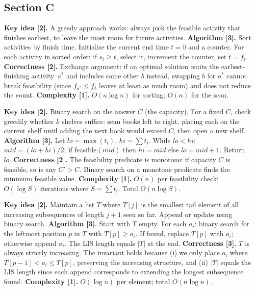 \subsection*{Section C}

\begin{solution}
\textbf{Key idea [2].} A greedy approach works: always pick the feasible activity that finishes earliest, to leave the most room for future activities.
\textbf{Algorithm [3].} Sort activities by finish time. Initialise the current end time $t=0$ and a counter. For each activity in sorted order: if $s_i \ge t$, select it, increment the counter, set $t = f_i$.
\textbf{Correctness [2].} Exchange argument: if an optimal solution omits the earliest-finishing activity~$a^*$ and includes some other $b$ instead, swapping $b$ for $a^*$ cannot break feasibility (since $f_{a^*} \le f_b$ leaves at least as much room) and does not reduce the count.
\textbf{Complexity [1].} $O(n \log n)$ for sorting; $O(n)$ for the scan.
\end{solution}

\begin{solution}
\textbf{Key idea [2].} Binary search on the answer $C$ (the capacity). For a fixed $C$, check greedily whether $k$ shelves suffice: scan books left to right, placing each on the current shelf until adding the next book would exceed $C$, then open a new shelf.
\textbf{Algorithm [3].} Let $lo = \max(t_i)$, $hi = \sum t_i$. While $lo < hi$: $mid = (lo+hi)/2$; if feasible$(mid)$ then $hi = mid$ else $lo = mid+1$. Return $lo$.
\textbf{Correctness [2].} The feasibility predicate is monotone: if capacity $C$ is feasible, so is any $C' > C$. Binary search on a monotone predicate finds the minimum feasible value.
\textbf{Complexity [1].} $O(n)$ per feasibility check; $O(\log S)$ iterations where $S = \sum t_i$. Total $O(n \log S)$.
\end{solution}

\begin{solution}
\textbf{Key idea [2].} Maintain a list $T$ where $T[j]$ is the smallest tail element of all increasing subsequences of length $j+1$ seen so far. Append or update using binary search.
\textbf{Algorithm [3].} Start with $T$ empty. For each $a_i$: binary search for the leftmost position $p$ in $T$ with $T[p] \ge a_i$. If found, replace $T[p]$ with $a_i$; otherwise append $a_i$. The LIS length equals $|T|$ at the end.
\textbf{Correctness [3].} $T$ is always strictly increasing. The invariant holds because (i) we only place $a_i$ where $T[p-1] < a_i \le T[p]$, preserving the increasing structure, and (ii) $|T|$ equals the LIS length since each append corresponds to extending the longest subsequence found.
\textbf{Complexity [1].} $O(\log n)$ per element; total $O(n \log n)$.
\end{solution}

